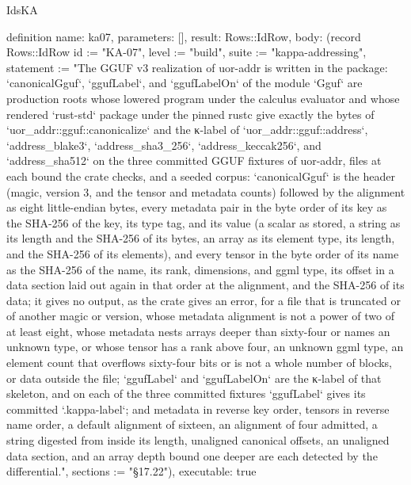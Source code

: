 \begin{lexlean}{IdsKA}
\begin{semanticmodule}
definition{
  name: ka07,
  parameters: [],
  result: Rows::IdRow,
  body: (record Rows::IdRow {id := "KA-07", level := "build", suite := "kappa-addressing", statement := "The GGUF v3 realization of uor-addr is written in the package: `canonicalGguf`, `ggufLabel`, and `ggufLabelOn` of the module `Gguf` are production roots whose lowered program under the calculus evaluator and whose rendered `rust-std` package under the pinned rustc give exactly the bytes of `uor_addr::gguf::canonicalize` and the κ-label of `uor_addr::gguf::address`, `address_blake3`, `address_sha3_256`, `address_keccak256`, and `address_sha512` on the three committed GGUF fixtures of uor-addr, files at each bound the crate checks, and a seeded corpus: `canonicalGguf` is the header (magic, version 3, and the tensor and metadata counts) followed by the alignment as eight little-endian bytes, every metadata pair in the byte order of its key as the SHA-256 of the key, its type tag, and its value (a scalar as stored, a string as its length and the SHA-256 of its bytes, an array as its element type, its length, and the SHA-256 of its elements), and every tensor in the byte order of its name as the SHA-256 of the name, its rank, dimensions, and ggml type, its offset in a data section laid out again in that order at the alignment, and the SHA-256 of its data; it gives no output, as the crate gives an error, for a file that is truncated or of another magic or version, whose metadata alignment is not a power of two of at least eight, whose metadata nests arrays deeper than sixty-four or names an unknown type, or whose tensor has a rank above four, an unknown ggml type, an element count that overflows sixty-four bits or is not a whole number of blocks, or data outside the file; `ggufLabel` and `ggufLabelOn` are the κ-label of that skeleton, and on each of the three committed fixtures `ggufLabel` gives its committed `.kappa-label`; and metadata in reverse key order, tensors in reverse name order, a default alignment of sixteen, an alignment of four admitted, a string digested from inside its length, unaligned canonical offsets, an unaligned data section, and an array depth bound one deeper are each detected by the differential.", sections := "§17.22"}),
  executable: true
}


\end{semanticmodule}
\end{lexlean}

